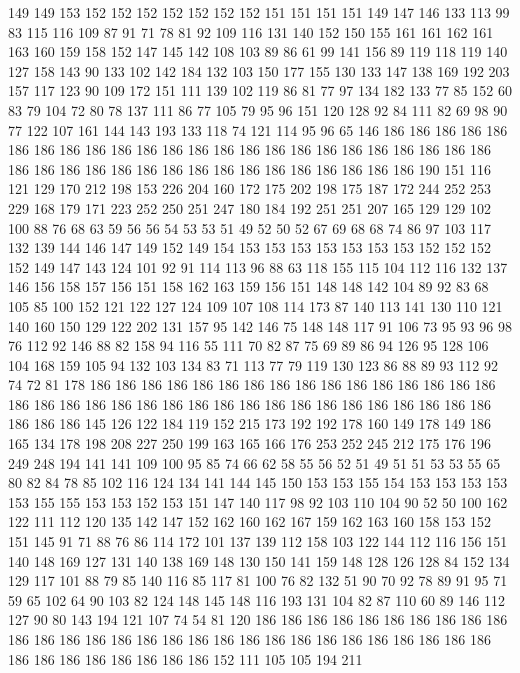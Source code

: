 149 149 153 152 152 152 152 152 152 152 151 151 151 151 149 147 146 133 113 99
83 115 116 109 87 91 71 78 81 92 109 116 131 140 152 150 155 161 161 162
161 163 160 159 158 152 147 145 142 108 103 89 86 61 99 141 156 89 119 118
119 140 127 158 143 90 133 102 142 184 132 103 150 177 155 130 133 147 138 169
192 203 157 117 123 90 109 172 151 111 139 102 119 86 81 77 97 134 182 133
77 85 152 60 83 79 104 72 80 78 137 111 86 77 105 79 95 96 151 120
128 92 84 111 82 69 98 90 77 122 107 161 144 143 193 133 118 74 121 114
95 96 65 146 186 186 186 186 186 186 186 186 186 186 186 186 186 186 186 186
186 186 186 186 186 186 186 186 186 186 186 186 186 186 186 186 186 186 186 186
186 186 186 186 190 151 116 121 129 170 212 198 153 226 204 160 172 175 202 198
175 187 172 244 252 253 229 168 179 171 223 252 250 251 247 180 184 192 251 251
207 165 129 129 102 100 88 76 68 63 59 56 56 54 53 53 51 49 52 50
52 67 69 68 68 74 86 97 103 117 132 139 144 146 147 149 152 149 154 153
153 153 153 153 153 153 152 152 152 152 149 147 143 124 101 92 91 114 113 96
88 63 118 155 115 104 112 116 132 137 146 156 158 157 156 151 158 162 163 159
156 151 148 148 142 104 89 92 83 68 105 85 100 152 121 122 127 124 109 107
108 114 173 87 140 113 141 130 110 121 140 160 150 129 122 202 131 157 95 142
146 75 148 148 117 91 106 73 95 93 96 98 76 112 92 146 88 82 158 94
116 55 111 70 82 87 75 69 89 86 94 126 95 128 106 104 168 159 105 94
132 103 134 83 71 113 77 79 119 130 123 86 88 89 93 112 92 74 72 81
178 186 186 186 186 186 186 186 186 186 186 186 186 186 186 186 186 186 186 186
186 186 186 186 186 186 186 186 186 186 186 186 186 186 186 186 186 186 186 145
126 122 184 119 152 215 173 192 192 178 160 149 178 149 186 165 134 178 198 208
227 250 199 163 165 166 176 253 252 245 212 175 176 196 249 248 194 141 141 109
100 95 85 74 66 62 58 55 56 52 51 49 51 51 53 53 55 65 80 82
84 78 85 102 116 124 134 141 144 145 150 153 153 155 154 153 153 153 153 153
155 155 153 153 152 153 151 147 140 117 98 92 103 110 104 90 52 50 100 162
122 111 112 120 135 142 147 152 162 160 162 167 159 162 163 160 158 153 152 151
145 91 71 88 76 86 114 172 101 137 139 112 158 103 122 144 112 116 156 151
140 148 169 127 131 140 138 169 148 130 150 141 159 148 128 126 128 84 152 134
129 117 101 88 79 85 140 116 85 117 81 100 76 82 132 51 90 70 92 78
89 91 95 71 59 65 102 64 90 103 82 124 148 145 148 116 193 131 104 82
87 110 60 89 146 112 127 90 80 143 194 121 107 74 54 81 120 186 186 186
186 186 186 186 186 186 186 186 186 186 186 186 186 186 186 186 186 186 186 186
186 186 186 186 186 186 186 186 186 186 186 186 186 186 152 111 105 105 194 211
